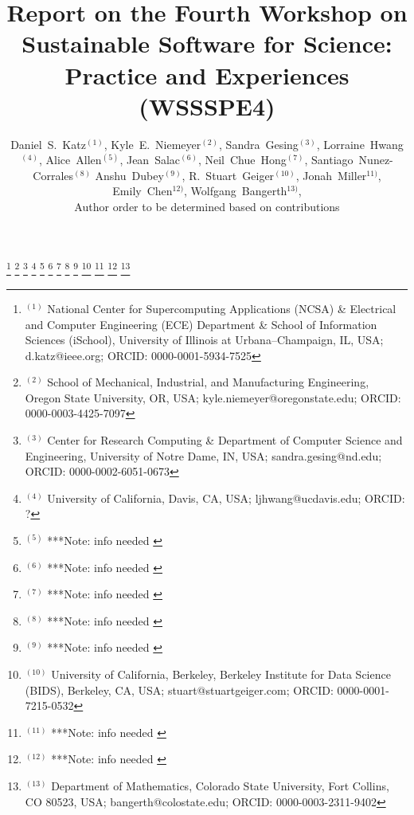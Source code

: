 \documentclass[11pt, oneside]{amsart}
\newcommand{\note}[1]{ {\textcolor{blueish}    { ***Note:      #1 }}}
\begin{document}
\title[]{Report on the Fourth Workshop on Sustainable Software for Science: Practice and Experiences (WSSSPE4)}

\author{Daniel~S.~Katz$^{(1)}$,
Kyle~E.~Niemeyer$^{(2)}$,
Sandra~Gesing$^{(3)}$,
Lorraine~Hwang$^{(4)}$,
Alice~Allen$^{(5)}$,
Jean~Salac$^{(6)}$,
Neil~Chue~Hong$^{(7)}$,
Santiago~Nunez-Corrales$^{(8)}$
Anshu~Dubey$^{(9)}$,
R.~Stuart~Geiger$^(10)$,
Jonah~Miller$^{11)}$,
Emily~Chen$^{12)}$,
Wolfgang~Bangerth$^{13)}$,
\\Author order to be determined based on contributions
}

%
\thanks{{}$^{(1)}$ \hspace{-1ex}National Center for Supercomputing Applications (NCSA) \&
Electrical and Computer Engineering (ECE) Department \&
School of Information Sciences (iSchool),
University of Illinois at Urbana--Champaign, IL, USA; d.katz@ieee.org; ORCID: 0000-0001-5934-7525}
%
\thanks{{}$^{(2)}$ School of Mechanical, Industrial, and Manufacturing Engineering,
Oregon State University, OR, USA; kyle.niemeyer@oregonstate.edu; ORCID: 0000-0003-4425-7097}
%
\thanks{{}$^{(3)}$ Center for Research Computing \& Department of Computer Science and Engineering,
University of Notre Dame, IN, USA; sandra.gesing@nd.edu; ORCID: 0000-0002-6051-0673}
%
\thanks{{}$^{(4)}$ University of California, Davis, CA, USA; ljhwang@ucdavis.edu; ORCID: ?}
%
\thanks{{}$^{(5)}$ \note{info needed}}
%
\thanks{{}$^{(6)}$ \note{info needed}}
%
\thanks{{}$^{(7)}$ \note{info needed}}
%
\thanks{{}$^{(8)}$ \note{info needed}}
%
\thanks{{}$^{(9)}$ \note{info needed}}
%
\thanks{{}$^{(10)}$ University of California, Berkeley, Berkeley Institute for Data Science (BIDS), Berkeley, CA, USA; stuart@stuartgeiger.com; ORCID: 0000-0001-7215-0532}
%
\thanks{{}$^{(11)}$ \note{info needed}}
%
\thanks{{}$^{(12)}$ \note{info needed}}
%
\thanks{{}$^{(13)}$ Department of Mathematics, Colorado State
  University, Fort Collins, CO 80523, USA; bangerth@colostate.edu; ORCID: 0000-0003-2311-9402}
\end{document}
